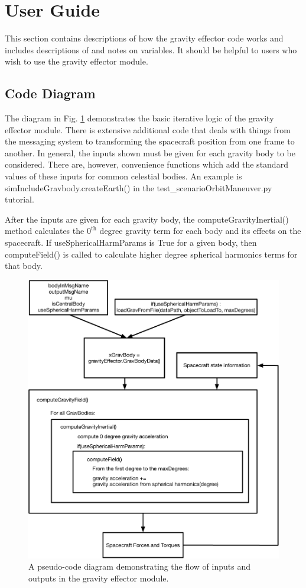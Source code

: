 \section{User Guide}
This section contains descriptions of how the gravity effector code works and includes descriptions of and notes on variables. It should be helpful to users who wish to use the gravity effector module.

\subsection{Code Diagram}
The diagram in Fig. \ref{img:codeFlow} demonstrates the basic iterative logic of the gravity effector module. There is extensive additional code that deals with things from the messaging system to transforming the spacecraft position from one frame to another. In general, the inputs shown must be given for each gravity body to be considered. There are, however, convenience functions which add the standard values of these inputs for common celestial bodies. An example is simIncludeGravbody.createEarth() in the test\_scenarioOrbitManeuver.py tutorial.

After the inputs are given for each gravity body, the computeGravityInertial() method calculates the $0^{\textrm{th}}$ degree gravity term for each body and its effects on the spacecraft. If useSphericalHarmParams is True for a given body, then computeField() is called to calculate higher degree spherical harmonics terms for that body.

\begin{figure}[H]
	\centering \includegraphics[height=1.0\textwidth, keepaspectratio]{Figures/codeFlow.pdf}
	\caption{A pseudo-code diagram demonstrating the flow of inputs and outputs in the gravity effector module.}
	\label{img:codeFlow}
\end{figure}

